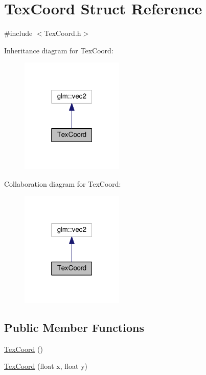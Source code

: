 \hypertarget{struct_tex_coord}{}\section{Tex\+Coord Struct Reference}
\label{struct_tex_coord}


{\ttfamily \#include $<$Tex\+Coord.\+h$>$}



Inheritance diagram for Tex\+Coord\+:
\nopagebreak
\begin{figure}[H]
\begin{center}
\leavevmode
\includegraphics[width=139pt]{struct_tex_coord__inherit__graph}
\end{center}
\end{figure}


Collaboration diagram for Tex\+Coord\+:
\nopagebreak
\begin{figure}[H]
\begin{center}
\leavevmode
\includegraphics[width=139pt]{struct_tex_coord__coll__graph}
\end{center}
\end{figure}
\subsection*{Public Member Functions}
\begin{DoxyCompactItemize}
\item 
\hyperlink{struct_tex_coord_ae1167f68dab931cc523e1f74fa5ad206}{Tex\+Coord} ()
\item 
\hyperlink{struct_tex_coord_a02018ed90402d77cb313b581c0ea0561}{Tex\+Coord} (float x, float y)
\end{DoxyCompactItemize}


